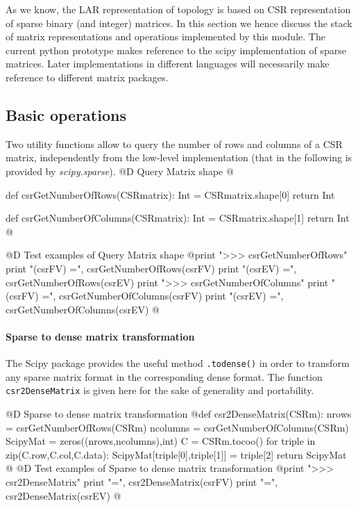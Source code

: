 \documentclass[11pt,oneside]{article}    %
\begin{document}
As we know, the LAR representation of topology is based on CSR representation of sparse binary (and integer) matrices. In this section we hence discuss the stack of matrix representations and operations implemented by this module.  The current python prototype makes reference to the scipy implementation of sparse matrices. Later implementations in different languages will necessarily make reference to different matrix packages.


\subsection{Basic operations}

Two utility functions allow to query the number of rows and columns of a CSR matrix, independently from the low-level implementation (that in the following is provided by \emph{scipy.sparse}).
@D Query Matrix shape
@{def csrGetNumberOfRows(CSRmatrix):
    Int = CSRmatrix.shape[0]
    return Int
    
def csrGetNumberOfColumns(CSRmatrix):
    Int = CSRmatrix.shape[1]
    return Int
@}
@D Test examples of Query Matrix shape
@{print "\n>>> csrGetNumberOfRows"
print "\ncsrGetNumberOfRows(csrFV) =", csrGetNumberOfRows(csrFV)
print "\ncsrGetNumberOfRows(csrEV) =", csrGetNumberOfRows(csrEV)
print "\n>>> csrGetNumberOfColumns"
print "\ncsrGetNumberOfColumns(csrFV) =", csrGetNumberOfColumns(csrFV)
print "\ncsrGetNumberOfColumns(csrEV) =", csrGetNumberOfColumns(csrEV)
@}

\paragraph{Sparse to dense matrix transformation}
The Scipy package provides the useful method \texttt{.todense()} in order to transform any sparse matrix format in the corresponding dense format. The function \texttt{csr2DenseMatrix} is given here for the sake of generality and portability.

@D Sparse to dense matrix transformation
@{def csr2DenseMatrix(CSRm):
    nrows = csrGetNumberOfRows(CSRm)
    ncolumns = csrGetNumberOfColumns(CSRm)
    ScipyMat = zeros((nrows,ncolumns),int)
    C = CSRm.tocoo()
    for triple in zip(C.row,C.col,C.data):
        ScipyMat[triple[0],triple[1]] = triple[2]
    return ScipyMat
@}
@D Test examples of Sparse to dense matrix transformation
@{print "\n>>> csr2DenseMatrix"
print "\nFV =\n", csr2DenseMatrix(csrFV)
print "\nEV =\n", csr2DenseMatrix(csrEV)
@}
\end{document}
